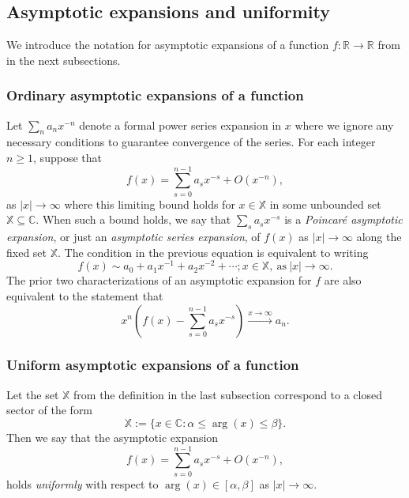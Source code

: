 \documentclass[11pt,reqno,a4letter]{article}
\numberwithin{figure}{section}
\numberwithin{table}{section}
\theoremstyle{plain}
\numberwithin{theorem}{section}
\theoremstyle{definition}
\begin{document}
\subsection{Asymptotic expansions and uniformity} 

We introduce the notation for asymptotic expansions of a function $f: \mathbb{R} \rightarrow \mathbb{R}$ from 
\cite[\S 2.1(iii)]{NISTHB} in the next subsections. 

\subsubsection{Ordinary asymptotic expansions of a function} 

Let $\sum_{n} a_n x^{-n}$ denote a formal power series expansion in $x$ where we 
ignore any necessary conditions to guarantee convergence of the series. 
For each integer $n \geq 1$, suppose that 
\[
f(x) = \sum_{s=0}^{n-1} a_s x^{-s} + O(x^{-n}), 
\]
as $|x| \rightarrow \infty$ where this limiting bound holds for $x \in \mathbb{X}$ in some unbounded set 
$\mathbb{X} \subseteq \mathbb{C}$. 
When such a bound holds, we say that $\sum_s a_s x^{-s}$ is a \emph{Poincar\'{e} asymptotic expansion}, 
or just an \emph{asymptotic series expansion}, of $f(x)$ as 
$|x| \rightarrow \infty$ along the fixed set $\mathbb{X}$. 
The condition in the previous equation is equivalent to writing 
\[
f(x) \sim a_0 + a_1 x^{-1} + a_2 x^{-2} + \cdots; x \in \mathbb{X}, \mathrm{\ as \ } |x| \rightarrow \infty. 
\]
The prior two characterizations of an asymptotic expansion for $f$ are also equivalent to the 
statement that 
\[
x^n \left(f(x) - \sum_{s=0}^{n-1} a_s x^{-s}\right) \xrightarrow{x \rightarrow \infty} a_n. 
\] 

\subsubsection{Uniform asymptotic expansions of a function} 

Let the set $\mathbb{X}$ from the definition in the last subsection correspond to a 
closed sector of the form 
$$\mathbb{X} := \{x \in \mathbb{C}: \alpha \leq \operatorname{arg}(x) \leq \beta\}.$$ 
Then we say that the asymptotic expansion 
\[
f(x) = \sum_{s=0}^{n-1} a_s x^{-s} + O(x^{-n}), 
\]
holds \emph{uniformly} with respect to $\operatorname{arg}(x) \in [\alpha, \beta]$ as 
$|x| \rightarrow \infty$. 
\end{document}

